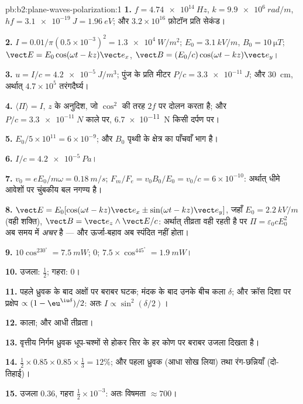 \begin{solution}{pb:b2:plane-waves-polarization:1}
\textbf{1.} $f = \qty{4.74e14}{Hz}$, $k = \qty{9.9e6}{rad/m}$, $hf = \qty{3.1e-19}{J} =
\qty{1.96}{eV}$; और $3.2 \times 10^{16}$ फ़ोटॉन प्रति सेकंड।

\textbf{2.} $I = 0.01/\pi(0.5 \times 10^{-3})^2 = \qty{1.3e4}{W/m^2}$; $E_0 = \qty{3.1}{kV/m}$,
$B_0 = \qty{10}{\micro T}$; $\vect E = E_0\cos(\omega t - kz)\vect e_x$, $\vect B = (E_0/c)\cos(\omega t
- kz)\vect e_y$।

\textbf{3.} $u = I/c = \qty{4.2e-5}{J/m^3}$; पुंज के प्रति मीटर $P/c = \qty{3.3e-11}{J}$;
और \qty{30}{cm}, अर्थात् $4.7 \times 10^5$ तरंगदैर्घ्य।

\textbf{4.} $\langle\Pi\rangle = I$, $z$ के अनुदिश, जो $\cos^2$ की तरह $2f$ पर दोलन करता है;
और $P/c = \qty{3.3e-11}{N}$ काले पर, \qty{6.7e-11}{N} किसी दर्पण पर।

\textbf{5.} $E_0/5 \times 10^{11} = 6 \times 10^{-9}$; और $B_0$ पृथ्वी के क्षेत्र का
पाँचवाँ भाग है।

\textbf{6.} $I/c = \qty{4.2e-5}{Pa}$।

\textbf{7.} $v_0 = eE_0/m\omega = \qty{0.18}{m/s}$; $F_m/F_e = v_0B_0/E_0 = v_0/c = 6 \times
10^{-10}$: अर्थात् धीमे आवेशों पर चुंबकीय बल नगण्य है।

\textbf{8.} $\vect E = E_0[\cos(\omega t - kz)\vect e_x \pm \sin(\omega t - kz)\vect e_y]$, जहाँ
$E_0 = \qty{2.2}{kV/m}$ (वही शक्ति), $\vect B = \vect e_z\wedge\vect E/c$: अर्थात्
तीव्रता वही रहती है पर $\Pi = \varepsilon_0cE_0^2$ अब समय में \emph{अचर} है
--- और ऊर्जा-बहाव अब स्पंदित नहीं होता।

\textbf{9.} $10\cos^230^\circ = \qty{7.5}{mW}$; $0$; $7.5 \times \cos^445^\circ = \qty{1.9}{mW}$।

\textbf{10.} उजला: $\tfrac12$; गहरा: $0$।

\textbf{11.} पहले ध्रुवक के बाद अक्षों पर बराबर घटक;
मंदक के बाद उनके बीच कला $\delta$; और क्रॉस दिशा पर प्रक्षेप
$\propto(1 - \eu^{\iu\delta})/2$: अतः $I \propto \sin^2(\delta/2)$।

\textbf{12.} काला; और आधी तीव्रता।

\textbf{13.} वृत्तीय निर्गम ध्रुवक धूप-चश्मों से होकर सिर के हर कोण पर
बराबर उजला दिखता है।

\textbf{14.} $\tfrac12 \times 0.85 \times 0.85 \times \tfrac13 = 12\%$; और पहला ध्रुवक
(आधा सोख लिया) तथा रंग-छन्नियाँ (दो-तिहाई)।

\textbf{15.} उजला $0.36$, गहरा $\tfrac12 \times 10^{-3}$: अतः विषमता $\approx 700$।


\end{solution}
